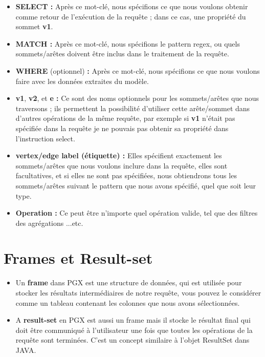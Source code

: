 \begin{itemize}[label=\textbullet]
\item \textbf{SELECT :} Après ce mot-clé, nous spécifions ce que nous voulons obtenir comme retour de l'exécution de la requête ; dans ce cas, une propriété du sommet \textbf{v1}.
\item \textbf{MATCH :} Après ce mot-clé, nous spécifions le pattern regex, ou quels sommets/arêtes doivent être inclus dans le traitement de la requête.
\item \textbf{WHERE } (optionnel) \textbf{ :} Après ce mot-clé, nous spécifions ce que nous voulons faire avec les données extraites du modèle.
\item \textbf{v1},  \textbf{v2}, et  \textbf{e :} Ce sont des noms optionnels pour les sommets/arêtes que nous traversons ; ils permettent la possibilité d'utiliser cette arête/sommet dans d'autres opérations de la même requête, par exemple si \textbf{v1} n'était pas spécifiée dans la requête je ne pouvais pas obtenir sa propriété dans l'instruction select.
\item \textbf{vertex/edge label (étiquette) :} Elles spécifient exactement les sommets/arêtes que nous voulons inclure dans la requête, elles sont facultatives, et si elles ne sont pas spécifiées, nous obtiendrons tous les sommets/arêtes suivant le pattern que nous avons spécifié, quel que soit leur type.
\item \textbf{Operation :} Ce peut être n'importe quel opération valide, tel que des filtres des agrégations ...etc.
\end{itemize}

\section{Frames et Result-set}
\begin{itemize}[label=\textbullet]
\item Un \textbf{frame} dans PGX est une structure de données, qui est utilisée pour stocker les résultats intermédiaires de notre requête, vous pouvez le considérer comme un tableau contenant les colonnes que nous avons sélectionnées.
\item A \textbf{result-set} en PGX est aussi un frame mais il stocke le résultat final qui doit être communiqué à l'utilisateur une fois que toutes les opérations de la requête sont terminées. C'est un concept similaire à l'objet ResultSet dans JAVA.
\end{itemize}

